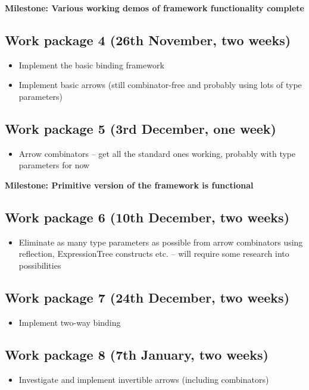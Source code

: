 	\noindent \textbf{Milestone: Various working demos of framework functionality complete}
	
	\subsection*{Work package 4 (26th November, two weeks)}
		\begin{itemize}
			\item Implement the basic binding framework
			\item Implement basic arrows (still combinator-free and probably using lots of type parameters)
		\end{itemize}
	
	\subsection*{Work package 5 (3rd December, one week)}
		\begin{itemize}
			\item Arrow combinators -- get all the standard ones working, probably with type parameters for now
		\end{itemize}
	
	\noindent \textbf{Milestone: Primitive version of the framework is functional}
	
	\subsection*{Work package 6 (10th December, two weeks)}
		\begin{itemize}
			\item Eliminate as many type parameters as possible from arrow combinators using reflection, ExpressionTree constructs etc. -- will require some research into possibilities
		\end{itemize}
	
	\subsection*{Work package 7 (24th December, two weeks)}
		\begin{itemize}
			\item Implement two-way binding
		\end{itemize}
	
	\subsection*{Work package 8 (7th January, two weeks)}
		\begin{itemize}
			\item Investigate and implement invertible arrows (including combinators)
		\end{itemize}
	
